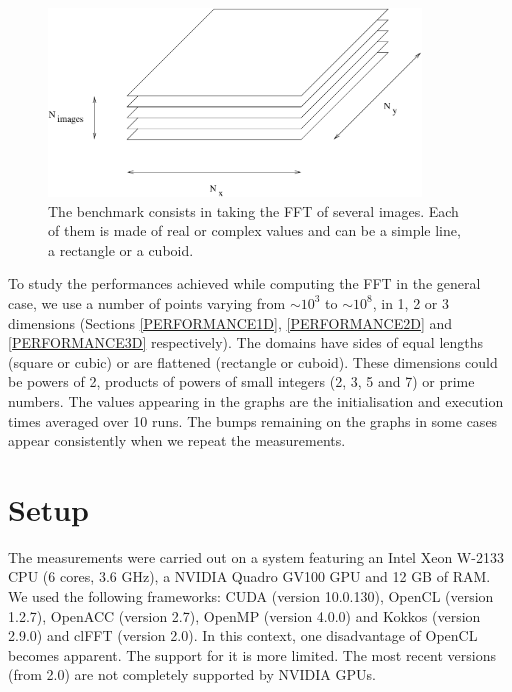 \documentclass[12pt, a4paper]{article}
\begin{document}
\begin{figure}[H]
\captionsetup{width=0.6\textwidth}
\centering
\includegraphics[height=5cm]{benchmark.pdf}
\caption{The benchmark consists in taking the FFT of several images. Each of them is made of real or complex values and can be a simple line, a rectangle or a cuboid.}
\label{benchmark}
\end{figure}

To study the performances achieved while computing the FFT in the general case, we use a number of points varying from $\sim 10^3$ to $\sim 10^8$, in 1, 2 or 3 dimensions (Sections \ref{PERFORMANCE1D}, \ref{PERFORMANCE2D} and \ref{PERFORMANCE3D} respectively). The domains have sides of equal lengths (square or cubic) or are flattened (rectangle or cuboid). These dimensions could be powers of 2, products of powers of small integers (2, 3, 5 and 7) or prime numbers. The values appearing in the graphs are the initialisation and execution times averaged over 10 runs. The bumps remaining on the graphs in some cases appear consistently when we repeat the measurements.

\section{Setup}

The measurements were carried out on a system featuring an Intel Xeon W-2133 CPU (6 cores, 3.6 GHz), a NVIDIA Quadro GV100 GPU and 12 GB of RAM. We used the following frameworks: CUDA (version 10.0.130), OpenCL (version 1.2.7), OpenACC (version 2.7), OpenMP (version 4.0.0) and Kokkos (version 2.9.0) and clFFT (version 2.0). In this context, one disadvantage of OpenCL becomes apparent. The support for it is more limited. The most recent versions (from 2.0) are not completely supported by NVIDIA GPUs.  
\end{document}
